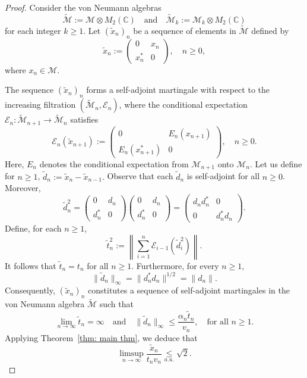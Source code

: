 \documentclass[10pt]{amsart}
\theoremstyle{definition}
\theoremstyle{myremark}
\numberwithin{equation}{section}
\newcommand{\CE}{\mathcal{E}}
\begin{document}
\begin{proof}
    Consider the von Neumann algebras 
    $$
    \tilde{\mathcal{M}} := \mathcal{M} \otimes M_2(\mathbb{C}) \quad \text{and} \quad \tilde{\mathcal{M}}_k := \mathcal{M}_k \otimes M_2(\mathbb{C})
    $$
    for each integer $k \geq 1$. Let $(\tilde{x}_n)_n$ be a sequence of elements in $\tilde{\mathcal{M}}$ defined by
    $$
    \tilde{x}_n := \begin{pmatrix}
    0 & x_n \\
    x_n^* & 0
    \end{pmatrix}, \quad n \geq 0,
    $$
    where $x_n \in \mathcal{M}$.
    
    The sequence $(\tilde{x}_n)_n$ forms a self-adjoint martingale with respect to the increasing filtration $(\tilde{\mathcal{M}}_n, \mathcal{E}_n)$, where the conditional expectation 
    $\mathcal{E}_n : \tilde{\mathcal{M}}_{n+1} \to \tilde{\mathcal{M}}_n$
    satisfies
    $$
    \mathcal{E}_n(\tilde{x}_{n+1}) := \begin{pmatrix}
    0 & E_n(x_{n+1}) \\
    E_n(x_{n+1}^*) & 0
    \end{pmatrix}, \quad n \geq 0.
    $$
    Here, $E_n$ denotes the conditional expectation from $\mathcal{M}_{n+1}$ onto $\mathcal{M}_n$.
    Let us define for $n\geq1$,
    $\tilde{d}_n := \tilde{x}_n - \tilde{x}_{n-1}.$
    Observe that each $\tilde{d}_n$ is self-adjoint for all $n \geq 0$. Moreover,
    \[
        \tilde{d}_n^2 = 
        \begin{pmatrix} 0 & d_n \\ d_n^* & 0 \end{pmatrix} 
        \begin{pmatrix} 0 & d_n \\ d_n^* & 0 \end{pmatrix} =
        \begin{pmatrix} d_n d_n^* & 0 \\ 0 & d_n^* d_n \end{pmatrix}.
    \]
    Define, for each $n \geq 1$,
    \[
        \tilde{t}_n^2 := \left\| \sum_{i=1}^n \CE_{i-1}\left(\tilde{d}_i^2\right) \right\|.
    \]
    It follows that $\tilde{t}_n = t_n$ for all $n \geq 1$. Furthermore, for every $n \geq 1$,
    \[
        \|\tilde{d}_n\|_\infty = \|d_n^* d_n\|^{1/2} = \|d_n\|.
    \]
    Consequently, $(\tilde{x}_n)_n$ constitutes a sequence of self-adjoint martingales in the von Neumann algebra $\tilde{\mathcal{M}}$ such that
    \[
        \lim_{n \to \infty} \tilde{t}_n = \infty
        \quad \text{and} \quad
        \|\tilde{d}_n\|_\infty \leq \frac{\alpha_n \tilde{t}_n}{v_n}, \quad \text{for all } n \geq 1.
    \]
    Applying Theorem~\ref{thm: main thm}, we deduce that
    \[
        \limsup_{n \to \infty} \frac{\tilde{x}_n}{t_n v_n} \underset{a.u.}{\leq} \sqrt{2}.
    \]


\end{proof}
\end{document}
